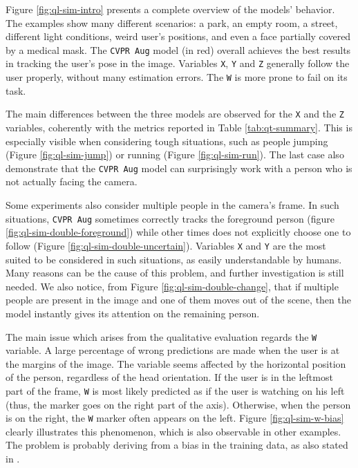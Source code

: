 Figure \ref{fig:ql-sim-intro} presents a complete overview of the models' behavior. The examples show many different scenarios: a park, an empty room, a street, different light conditions, weird user's positions, and even a face partially covered by a medical mask. The \texttt{CVPR Aug} model (in red) overall achieves the best results in tracking the user's pose in the image. Variables \texttt{X}, \texttt{Y} and \texttt{Z} generally follow the user properly, without many estimation errors. The \texttt{W} is more prone to fail on its task.

\medskip

The main differences between the three models are observed for the \texttt{X} and the \texttt{Z} variables, coherently with the metrics reported in Table \ref{tab:qt-summary}. This is especially visible when considering tough situations, such as people jumping (Figure \ref{fig:ql-sim-jump}) or running (Figure \ref{fig:ql-sim-run}). The last case also demonstrate that the \texttt{CVPR Aug} model can surprisingly work with a person who is not actually facing the camera.

Some experiments also consider multiple people in the camera's frame. In such situations, \texttt{CVPR Aug} sometimes correctly tracks the foreground person (figure \ref{fig:ql-sim-double-foreground}) while other times does not explicitly choose one to follow (Figure \ref{fig:ql-sim-double-uncertain}). Variables \texttt{X} and \texttt{Y} are the most suited to be considered in such situations, as easily understandable by humans. Many reasons can be the cause of this problem, and further investigation is still needed. We also notice, from Figure \ref{fig:ql-sim-double-change}, that if multiple people are present in the image and one of them moves out of the scene, then the model instantly gives its attention on the remaining person.


The main issue which arises from the qualitative evaluation regards the \texttt{W} variable. A large percentage of wrong predictions are made when the user is at the margins of the image. The variable seems affected by the horizontal position of the person, regardless of the head orientation. If the user is in the leftmost part of the frame, \texttt{W} is most likely predicted as if the user is watching on his left (thus, the marker goes on the right part of the axis). Otherwise, when the person is on the right, the \texttt{W} marker often appears on the left. Figure \ref{fig:ql-sim-w-bias} clearly illustrates this phenomenon, which is also observable in other examples. The problem is probably deriving from a bias in the training data, as also stated in \cite{mantegazza2018thesis}.

